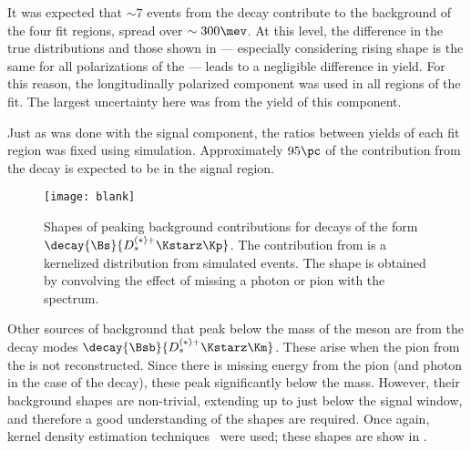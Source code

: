 It was expected that $\sim7$ events from the decay \btodsstrphi contribute to the background of the
four fit regions, spread over $\sim300\mev$.
At this level, the difference in the true distributions and those shown in 
--- especially considering rising shape is the same for all polarizations of the \phii ---
leads to a negligible difference in yield.
For this reason, the longitudinally polarized \btodsstrphi component was used in all regions of the
fit.
The largest uncertainty here was from the yield of this component.

Just as was done with the signal component, the ratios between yields of each fit region was fixed
using simulation.
Approximately $95\pc$ of the contribution from the decay \btodsstrphi is expected to be in the
signal region.


\begin{figure}
  \begin{center}
    \texttt{[image: blank]}
    \caption[Shapes of background contributions of \bstodskstrk and \bstodskstrk]
    {\small
      Shapes of peaking background contributions for
      decays of the form $\decay{\Bs}{D_s^{(*)+}\Kstarz\Kp}$.
      The contribution from \bstodskstrk is a kernelized distribution from
      simulated events.
      The \bstodsstrkstrk shape is obtained by convolving the
      effect of missing a photon or pion with the \bstodskstrk spectrum.
    }
    \label{fig:dsphi:bkgshape}
  \end{center}
\end{figure}






Other sources of background that peak below the mass of the \Bp meson are from the decay modes
$\decay{\Bsb}{D_s^{(*)+}\Kstarz\Km}$.
These arise when the pion from the \decay{\Kstarz}{\Kp\pim} is not reconstructed.
Since there is missing energy from the pion (and photon in the case of the \Dssp decay), these peak
significantly below the \Bp mass.
However, their background shapes are non-trivial, extending up to just below the signal window,
and therefore a good understanding of the shapes are required.
Once again, kernel density estimation techniques~\cite{Cranmer:2000du} were used; these shapes are
show in .

